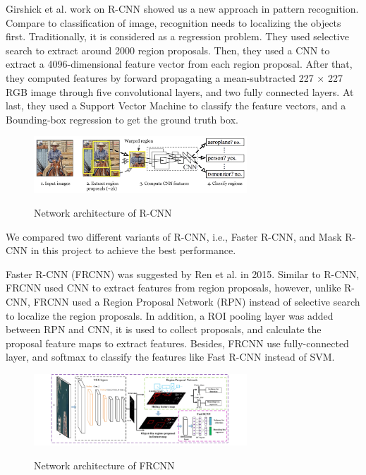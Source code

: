 \documentclass[runningheads]{llncs}
\begin{document}
Girshick et al. work on R-CNN showed us a new approach in 
pattern recognition. Compare to classification of image, 
recognition needs to localizing the objects first. 
Traditionally, it is considered as a regression problem. 
They used selective search to extract around 2000 region 
proposals. Then, they used a CNN to extract a 
4096-dimensional feature vector from each region proposal. 
After that, they computed features by forward propagating
a mean-subtracted 227 × 227 RGB image through five 
convolutional layers, and two fully connected layers. At 
last, they used a Support Vector Machine to classify the 
feature vectors, and a Bounding-box regression to get the 
ground truth box. 

\begin{figure}
    \centering
    \includegraphics[width=8cm]{reference/rcnn}
    \label{fig:RCNN}
    \caption{Network architecture of R-CNN}
\end{figure}

We compared two different variants of R-CNN, i.e., 
Faster R-CNN, and Mask R-CNN in this project to achieve the 
best performance. 

Faster R-CNN\cite{FasterRCNN} (FRCNN) was suggested by Ren 
et al. in 2015. Similar to R-CNN, FRCNN used CNN to 
extract features from region proposals, however, unlike 
R-CNN, FRCNN used a Region Proposal Network (RPN) instead 
of selective search to localize the region proposals. In 
addition, a ROI pooling layer was added between RPN and 
CNN, it is used to collect proposals, and calculate the 
proposal feature maps to extract features. Besides, FRCNN 
use fully-connected layer, and softmax to classify the 
features like Fast R-CNN instead of SVM. 

\begin{figure}
    \centering
    \includegraphics[width=8cm]{reference/frcnn}
    \label{fig:FRCNN}
    \caption{Network architecture of FRCNN}
\end{figure}
\end{document}
